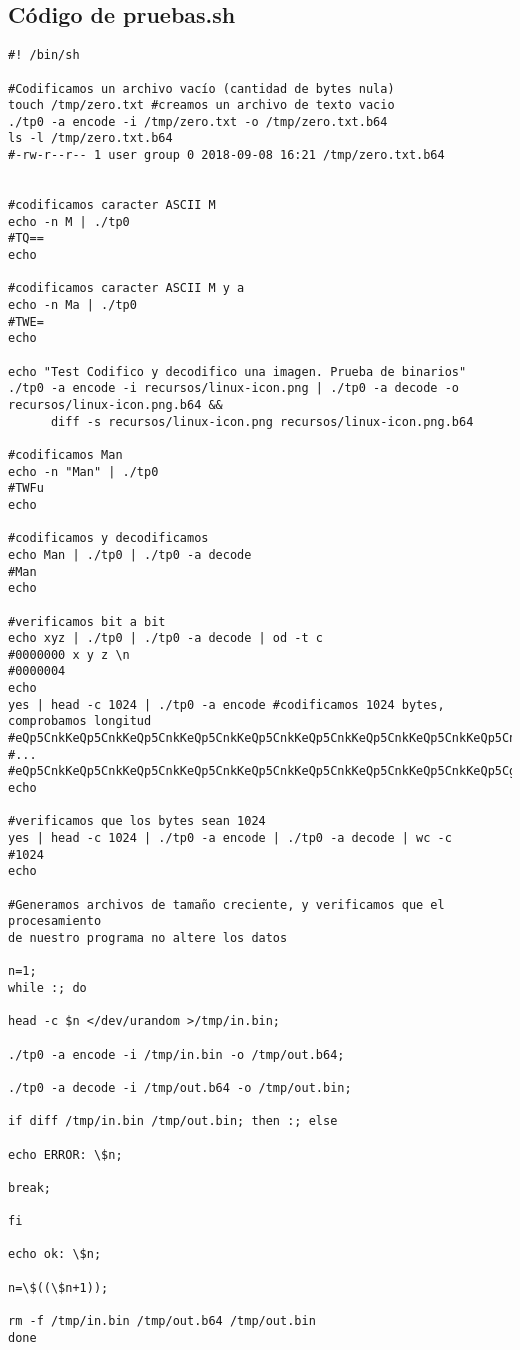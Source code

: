 \documentclass[a4paper,11pt, margin=1in]{article}
\begin{document}
\subsection{Código de pruebas.sh}
\begin{verbatim}
#! /bin/sh

#Codificamos un archivo vacío (cantidad de bytes nula)
touch /tmp/zero.txt #creamos un archivo de texto vacio
./tp0 -a encode -i /tmp/zero.txt -o /tmp/zero.txt.b64
ls -l /tmp/zero.txt.b64
#-rw-r--r-- 1 user group 0 2018-09-08 16:21 /tmp/zero.txt.b64


#codificamos caracter ASCII M
echo -n M | ./tp0 
#TQ==
echo

#codificamos caracter ASCII M y a
echo -n Ma | ./tp0 
#TWE=
echo

echo "Test Codifico y decodifico una imagen. Prueba de binarios"
./tp0 -a encode -i recursos/linux-icon.png | ./tp0 -a decode -o recursos/linux-icon.png.b64 &&
      diff -s recursos/linux-icon.png recursos/linux-icon.png.b64

#codificamos Man
echo -n "Man" | ./tp0 
#TWFu
echo

#codificamos y decodificamos
echo Man | ./tp0 | ./tp0 -a decode
#Man
echo

#verificamos bit a bit
echo xyz | ./tp0 | ./tp0 -a decode | od -t c
#0000000 x y z \n
#0000004
echo
yes | head -c 1024 | ./tp0 -a encode #codificamos 1024 bytes, comprobamos longitud
#eQp5CnkKeQp5CnkKeQp5CnkKeQp5CnkKeQp5CnkKeQp5CnkKeQp5CnkKeQp5CnkKeQp5CnkK
#...
#eQp5CnkKeQp5CnkKeQp5CnkKeQp5CnkKeQp5CnkKeQp5CnkKeQp5CnkKeQp5CnkKeQp5Cg==
echo

#verificamos que los bytes sean 1024
yes | head -c 1024 | ./tp0 -a encode | ./tp0 -a decode | wc -c 
#1024
echo

#Generamos archivos de tamaño creciente, y verificamos que el procesamiento
de nuestro programa no altere los datos

n=1;
while :; do

head -c $n </dev/urandom >/tmp/in.bin;

./tp0 -a encode -i /tmp/in.bin -o /tmp/out.b64;

./tp0 -a decode -i /tmp/out.b64 -o /tmp/out.bin;

if diff /tmp/in.bin /tmp/out.bin; then :; else

echo ERROR: \$n;

break;

fi

echo ok: \$n;

n=\$((\$n+1));

rm -f /tmp/in.bin /tmp/out.b64 /tmp/out.bin
done
\end{verbatim}
\end{document}
